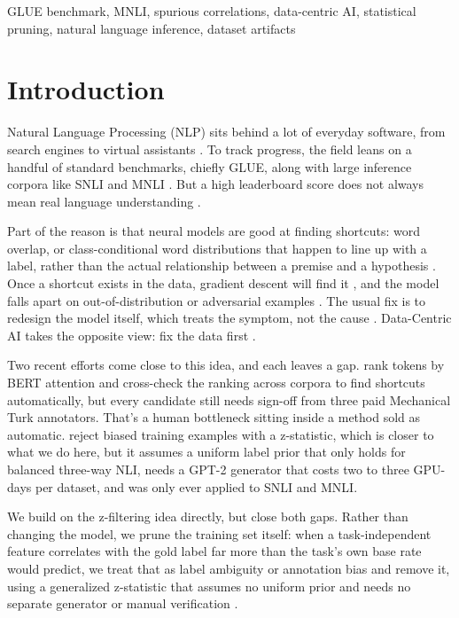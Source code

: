 \documentclass[conference]{IEEEtran}
\begin{document}
\begin{IEEEkeywords}
GLUE benchmark, MNLI, spurious correlations, data-centric AI, statistical pruning, natural language inference, dataset artifacts
\end{IEEEkeywords}

\section{Introduction}

Natural Language Processing (NLP) sits behind a lot of everyday software, from search engines to virtual assistants \cite{devlin2019bert, liu2019roberta}. To track progress, the field leans on a handful of standard benchmarks, chiefly GLUE, along with large inference corpora like SNLI and MNLI \cite{wang2018glue, bowman2015large, williams2018broad}. But a high leaderboard score does not always mean real language understanding \cite{geirhos2020shortcut}.

Part of the reason is that neural models are good at finding shortcuts: word overlap, or class-conditional word distributions that happen to line up with a label, rather than the actual relationship between a premise and a hypothesis \cite{wang2022identifying}. Once a shortcut exists in the data, gradient descent will find it \cite{mccoy2019right, gururangan2018annotation, poliak2018hypothesis}, and the model falls apart on out-of-distribution or adversarial examples \cite{tu2020empirical, sagawa2020investigation}. The usual fix is to redesign the model itself, which treats the symptom, not the cause \cite{gardner2021competency}. Data-Centric AI takes the opposite view: fix the data first \cite{jakubik2024datacentric}.

Two recent efforts come close to this idea, and each leaves a gap. \cite{wang2022identifying} rank tokens by BERT attention and cross-check the ranking across corpora to find shortcuts automatically, but every candidate still needs sign-off from three paid Mechanical Turk annotators. That's a human bottleneck sitting inside a method sold as automatic. \cite{wu2022generating} reject biased training examples with a z-statistic, which is closer to what we do here, but it assumes a uniform label prior that only holds for balanced three-way NLI, needs a GPT-2 generator that costs two to three GPU-days per dataset, and was only ever applied to SNLI and MNLI.

We build on the z-filtering idea directly, but close both gaps. Rather than changing the model, we prune the training set itself: when a task-independent feature correlates with the gold label far more than the task's own base rate would predict, we treat that as label ambiguity or annotation bias and remove it, using a generalized z-statistic that assumes no uniform prior and needs no separate generator or manual verification \cite{wu2022generating}.
\end{document}
